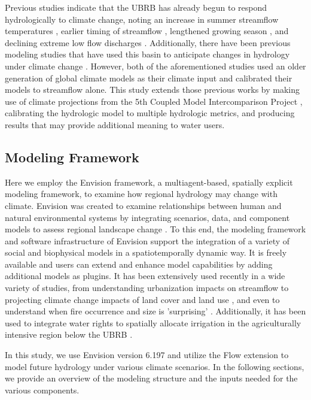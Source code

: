 \documentclass[water,article,submit,moreauthors,pdftex,10pt,a4paper]{mdpi}
\theoremstyle{mdpi}
\newcounter{ex}
\newcounter{re}
\theoremstyle{mdpidefinition}
\begin{document}
Previous studies indicate that the UBRB has already begun to respond hydrologically to climate change, noting an increase in summer streamflow temperatures \citep{Isaak:2010fn}, earlier timing of streamflow \citep{Clark:2010bq}, lengthened growing season \citep{Kunkel:2004bh}, and declining extreme low flow discharges \citep{Kormos:2016hy}. Additionally, there have been previous modeling studies that have used this basin to anticipate changes in hydrology under climate change \citep{Stillwater:2008uf,Jin:2011ii}. However, both of the aforementioned studies used an older generation of global climate models as their climate input and calibrated their models to streamflow alone. This study extends those previous works by making use of climate projections from the 5th Coupled Model Intercomparison Project \citep[CMIP5,][]{Taylor:2012jga}, calibrating the hydrologic model to multiple hydrologic metrics, and producing results that may provide additional meaning to water users.

\subsection{Modeling Framework}
Here we employ the Envision framework, a multiagent-based, spatially explicit modeling framework, to examine how regional hydrology may change with climate. Envision was created to examine relationships between human and natural environmental systems by integrating scenarios, data, and component models to assess regional landscape change \citep{Bolte:2007tb}. To this end, the modeling framework and software infrastructure of Envision support the integration of a variety of social and biophysical models in a spatiotemporally dynamic way. It is freely available and users can extend and enhance model capabilities by adding additional models as plugins. It has been extensively used recently in a wide variety of studies, from understanding urbanization impacts on streamflow \citep{Wu:2015tx} to projecting climate change impacts of land cover and land use \citep{Turner:2015wn}, and even to understand when fire occurrence and size is 'surprising' \citep{Hulse:2016wy}. Additionally, it has been used to integrate water rights to spatially allocate irrigation in the agriculturally intensive region below the UBRB \citep{Han:2017tx}. 

In this study, we use Envision version 6.197 and utilize the Flow extension to model future hydrology under various climate scenarios. In the following sections, we provide an overview of the modeling structure and the inputs needed for the various components.
\end{document}
